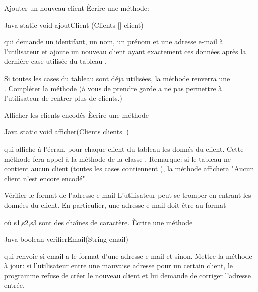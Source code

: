 \documentclass[a4paper,11pt]{article}
\begin{document}
   \begin{Exercice}{Ajouter un nouveau client}
   	 		\`Ecrire une m\'ethode:
		\begin{Code}{Java}
		    static void ajoutClient (Clients [] client)
		\end{Code}
qui demande un identifant, un nom, un pr\'enom et une adresse e-mail \`a l'utilisateur et ajoute un nouveau client ayant exactement ces données apr\`es la derni\`ere case utilis\'ee du tableau .

Si toutes les cases du tableau sont d\'eja utilis\'ees, la m\'ethode renverra une \\. Compl\'eter la m\'ethode  (\`a vous de prendre garde a ne pas permettre \`a l'utilisateur de rentrer plus de  clients.)
				
\end{Exercice}
  
  	\begin{Exercice}{Afficher les clients encod\'es}
	\`Ecrire une m\'ethode
	
		\begin{Code}{Java}
		    static void afficher(Clients clients[])
		\end{Code}
	qui affiche \`a l'\'ecran, pour chaque client du tableau  les donn\'es du client. Cette m\'ethode fera appel \`a la m\'ethode  de la classe . Remarque: si le tableau ne contient aucun client (toutes les cases contiennent ), la m\'ethode affichera "Aucun client n'est encore encod\'e".
		
	\end{Exercice}
	
\begin{Exercice}{V\'erifier le format de l'adresse e-mail}
		L'utilisateur peut se tromper en entrant les donn\'ees du client. En particulier, une adresse e-mail doit \^etre au format 
		
		
		o\`u s1,s2,s3 sont des cha\^ines de caract\`ere. \`Ecrire une m\'ethode 
		
		\begin{Code}{Java}
		boolean verifierEmail(String email)
		\end{Code}
		
		qui renvoie  si email a le format d'une adresse e-mail et  sinon.
		Mettre la m\'ethode  \`a jour: si l'utilisateur entre une mauvaise adresse pour un certain client, le programme refuse de cr\'eer le nouveau client et lui demande de corriger      l'adresse entr\'ee.
	\end{Exercice}
\end{document}
